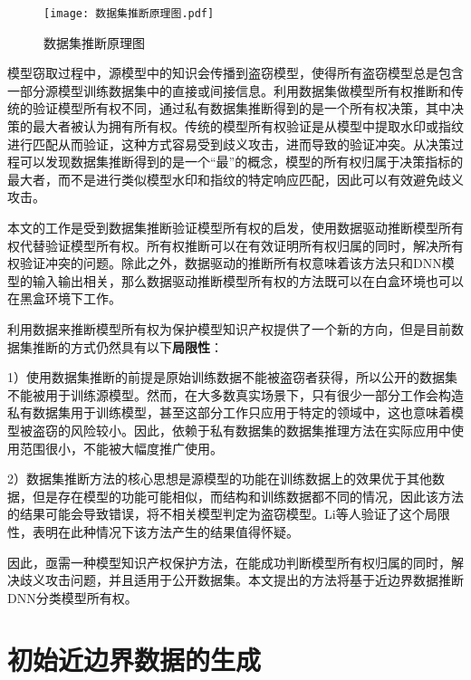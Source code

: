 \begin{figure}[htbp]%
	\centering
	\setlength{\abovecaptionskip}{3mm} %
	\setlength{\belowcaptionskip}{-3mm} %
	\texttt{[image: 数据集推断原理图.pdf]}
	\caption{数据集推断原理图}
	\label{数据集推断原理图}
\end {figure}	

模型窃取过程中，源模型中的知识会传播到盗窃模型，使得所有盗窃模型总是包含一部分源模型训练数据集中的直接或间接信息。利用数据集做模型所有权推断和传统的验证模型所有权不同，通过私有数据集推断得到的是一个所有权决策，其中决策的最大者被认为拥有所有权。传统的模型所有权验证是从模型中提取水印或指纹进行匹配从而验证，这种方式容易受到歧义攻击，进而导致的验证冲突。从决策过程可以发现数据集推断得到的是一个“最”的概念，模型的所有权归属于决策指标的最大者，而不是进行类似模型水印和指纹的特定响应匹配，因此可以有效避免歧义攻击。

本文的工作是受到数据集推断验证模型所有权的启发，使用数据驱动推断模型所有权代替验证模型所有权。所有权推断可以在有效证明所有权归属的同时，解决所有权验证冲突的问题。除此之外，数据驱动的推断所有权意味着该方法只和DNN模型的输入输出相关，那么数据驱动推断模型所有权的方法既可以在白盒环境也可以在黑盒环境下工作。

利用数据来推断模型所有权为保护模型知识产权提供了一个新的方向，但是目前数据集推断的方式仍然具有以下\textbf{局限性}：

1）使用数据集推断的前提是原始训练数据不能被盗窃者获得，所以公开的数据集不能被用于训练源模型。然而，在大多数真实场景下，只有很少一部分工作会构造私有数据集用于训练模型，甚至这部分工作只应用于特定的领域中，这也意味着模型被盗窃的风险较小。因此，依赖于私有数据集的数据集推理方法在实际应用中使用范围很小，不能被大幅度推广使用。

2）数据集推断方法的核心思想是源模型的功能在训练数据上的效果优于其他数据，但是存在模型的功能可能相似，而结构和训练数据都不同的情况，因此该方法的结果可能会导致错误，将不相关模型判定为盗窃模型。Li等人\cite{lao2022deepauth}验证了这个局限性，表明在此种情况下该方法产生的结果值得怀疑。

因此，亟需一种模型知识产权保护方法，在能成功判断模型所有权归属的同时，解决歧义攻击问题，并且适用于公开数据集。本文提出的方法将基于近边界数据推断DNN分类模型所有权。


\section{初始近边界数据的生成}\label{3.3}


